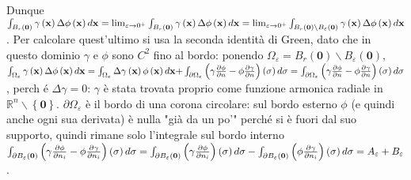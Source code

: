 \documentclass{article}
\begin{document}
Dunque $\int_{B_{r}\left( \mathbf{0}\right) }\gamma \left( \mathbf{x}\right)
\Delta \phi \left( \mathbf{x}\right) d\mathbf{x}=\lim_{\varepsilon
\rightarrow 0^{+}}\int_{B_{r}\left( \mathbf{0}\right) }\gamma \left( \mathbf{%
x}\right) \Delta \phi \left( \mathbf{x}\right) d\mathbf{x}=\lim_{\varepsilon
\rightarrow 0^{+}}\int_{B_{r}\left( \mathbf{0}\right) \backslash
B_{\varepsilon }\left( \mathbf{0}\right) }\gamma \left( \mathbf{x}\right)
\Delta \phi \left( \mathbf{x}\right) d\mathbf{x}$. Per calcolare
quest'ultimo si usa la seconda identit\`{a} di Green, dato che in questo
dominio $\gamma $ e $\phi $ sono $C^{2}$ fino al bordo: ponendo $\Omega
_{\varepsilon }=B_{r}\left( \mathbf{0}\right) \backslash B_{\varepsilon
}\left( \mathbf{0}\right) $, $\int_{\Omega _{\varepsilon }}\gamma \left( 
\mathbf{x}\right) \Delta \phi \left( \mathbf{x}\right) d\mathbf{x}%
=\int_{\Omega _{\varepsilon }}\Delta \gamma \left( \mathbf{x}\right) \phi
\left( \mathbf{x}\right) d\mathbf{x+}\int_{\partial \Omega _{\varepsilon
}}\left( \gamma \frac{\partial \phi }{\partial n}-\phi \frac{\partial \gamma 
}{\partial n}\right) \left( \sigma \right) d\sigma =\int_{\partial \Omega
_{\varepsilon }}\left( \gamma \frac{\partial \phi }{\partial n}-\phi \frac{%
\partial \gamma }{\partial n}\right) \left( \sigma \right) d\sigma $, perch%
\'{e} $\Delta \gamma =0$: $\gamma $ \`{e} stata trovata proprio come
funzione armonica radiale in $%
\mathbb{R}
^{n}\backslash \left\{ \mathbf{0}\right\} $. $\partial \Omega _{\varepsilon
} $ \`{e} il bordo di una corona circolare: sul bordo esterno $\phi $ (e
quindi anche ogni sua derivata) \`{e} nulla "gi\`{a} da un po'" perch\'{e}
si \`{e} fuori dal suo supporto, quindi rimane solo l'integrale sul bordo
interno $\int_{\partial B_{\varepsilon }\left( \mathbf{0}\right) }\left(
\gamma \frac{\partial \phi }{\partial n_{i}}-\phi \frac{\partial \gamma }{%
\partial n_{i}}\right) \left( \sigma \right) d\sigma =\int_{\partial
B_{\varepsilon }\left( \mathbf{0}\right) }\left( \gamma \frac{\partial \phi 
}{\partial n_{i}}\right) \left( \sigma \right) d\sigma -\int_{\partial
B_{\varepsilon }\left( \mathbf{0}\right) }\left( \phi \frac{\partial \gamma 
}{\partial n_{i}}\right) \left( \sigma \right) d\sigma =A_{\varepsilon
}+B_{\varepsilon }$.
\end{document}
